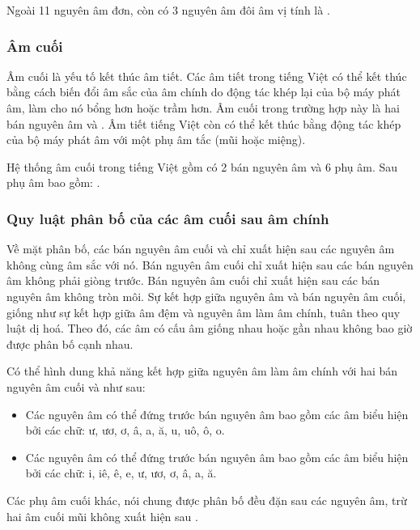 \documentclass[a4paper,oneside,14pt]{extbook} %
\begin{document}
Ngoài 11 nguyên âm đơn, còn có 3 nguyên âm đôi âm vị tính là
.

\subsubsection{Âm cuối}

Âm cuối là yếu tố kết thúc âm tiết. Các âm tiết trong tiếng Việt có
thể kết thúc bằng cách biến đổi âm sắc của âm chính do động tác khép
lại của bộ máy phát âm, làm cho nó bổng hơn hoặc trầm hơn. Âm cuối
trong trường hợp này là hai bán nguyên âm  và
. Âm tiết tiếng Việt còn có thể kết thúc bằng động tác
khép của bộ máy phát âm với một phụ âm tắc (mũi hoặc miệng).

Hệ thống âm cuối trong tiếng Việt gồm có 2 bán nguyên âm và 6 phụ
âm. Sau phụ âm bao gồm: .


\subsubsection{Quy luật phân bố của các âm cuối sau âm chính}

Về mặt phân bố, các bán nguyên âm cuối  và
 chỉ xuất hiện sau các nguyên âm không cùng âm sắc với
nó. Bán nguyên âm cuối  chỉ xuất hiện sau các bán nguyên
âm không phải giòng trước. Bán nguyên âm cuối  chỉ xuất
hiện sau các bán nguyên âm không tròn môi. Sự kết hợp giữa nguyên âm
và bán nguyên âm cuối, giống như sự kết hợp giữa âm đệm và nguyên âm
làm âm chính, tuân theo quy luật dị hoá. Theo đó, các âm có cấu âm
giống nhau hoặc gần nhau không bao giờ được phân bố cạnh nhau.

Có thể hình dung khả năng kết hợp giữa nguyên âm làm âm chính với hai
bán nguyên âm cuối  và  như sau:
\begin{itemize}
\item Các nguyên âm có thể đứng trước bán nguyên âm  bao
  gồm các âm biểu hiện bởi các chữ: ư, ươ, ơ, â, a, ă, u, uô, ô, o.
\item Các nguyên âm có thể đứng trước bán nguyên âm  bao
  gồm các âm biểu hiện bởi các chữ: i, iê, ê, e, ư, ươ, ơ, â, a, ă.
\end{itemize}

Các phụ âm cuối khác, nói chung được phân bố đều đặn sau các nguyên
âm, trừ hai âm cuối mũi  không xuất hiện sau
.
\end{document}
